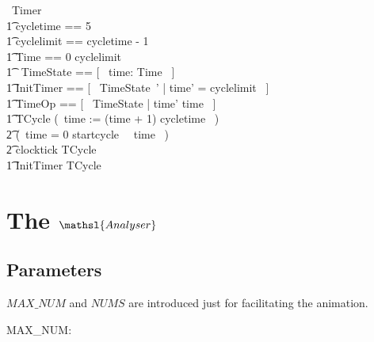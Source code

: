 \documentclass{report} %
\begin{document}
\begin{circus}
   \circprocess\ Timer ~\circdef~ \circbegin \\
     \t1 cycletime == 5 \\ %
     \t1 cyclelimit == cycletime - 1 \\ %
     \t1 Time == 0 \upto cyclelimit \\
     \t1 \circstate\ TimeState == [~ time: Time ~] \\ %
     \t1 InitTimer == [~ TimeState~' | time' = cyclelimit ~] \\
     \t1 TimeOp == [~ \Delta TimeState | time' \geq time ~] \\
     \t1 TCycle \circdef (~time := (time + 1) \mod cycletime ~) \circseq \\ %
            \t2 (\circif\ time = 0 \circthen startcycle \then \Skip\ \circelse\ time  \circthen \Skip\ \circfi) \circseq \\ %
            \t2 clocktick \then TCycle
            \\
      \t1 \circspot \lschexpract InitTimer \rschexpract \circseq TCycle \\
   \circend
\end{circus}

\chapter{The $\mathsl{Analyser}$}
\section{Parameters}

$MAX\_NUM$ and $NUMS$ are introduced just for facilitating the animation.
\begin{axdef}
  MAX\_NUM: \nat
\end{axdef}
\end{document}
